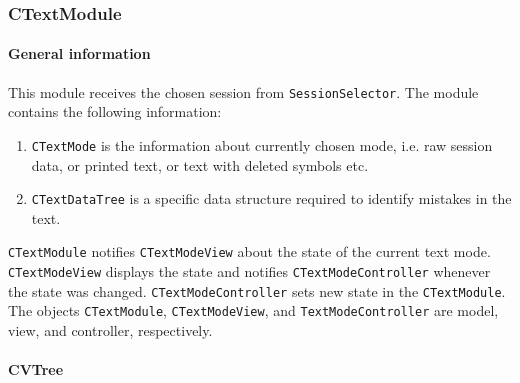 \documentclass{article}
\begin{document}
\subsubsection{CTextModule}

\paragraph{General information}

This module receives the chosen session from \verb"SessionSelector". The module contains the following information:
\begin{enumerate}
\item \verb"CTextMode" is the information about currently chosen mode, i.e. raw session data, or printed text, or text with deleted symbols etc.
\item \verb"CTextDataTree" is a specific data structure required to identify mistakes in the text.
\end{enumerate}

\verb"CTextModule" notifies \verb"CTextModeView" about the state of the current text mode. \verb"CTextModeView" displays the state and notifies \verb"CTextModeController" whenever the state was changed. \verb"CTextModeController" sets new state in the \verb"CTextModule". The objects \verb"CTextModule", \verb"CTextModeView", and \verb"TextModeController" are model, view, and controller, respectively.

\paragraph{CVTree}
\end{document}

